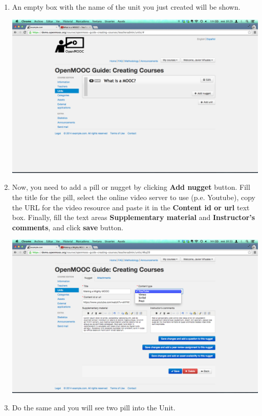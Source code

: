 \documentclass[letterpaper,10pt,english]{sphinxmanual}
\begin{document}
\begin{enumerate}
\item {} 
An empty box with the name of the unit you just created will be shown.

\includegraphics{4_course_units-6.png}

\item {} 
Now, you need to add a pill or nugget by clicking \textbf{Add nugget} button. Fill the title for the pill, select the online video server to use (p.e. Youtube), copy the URL for the video resource and paste it in the \textbf{Content id or url} text box. Finally, fill the text areas \textbf{Supplementary material} and \textbf{Instructor's comments}, and click \textbf{save} button.

\includegraphics{4_course_units-7.png}

\item {} 
Do the same and you will see two pill into the Unit.


\end{enumerate}
\end{document}
